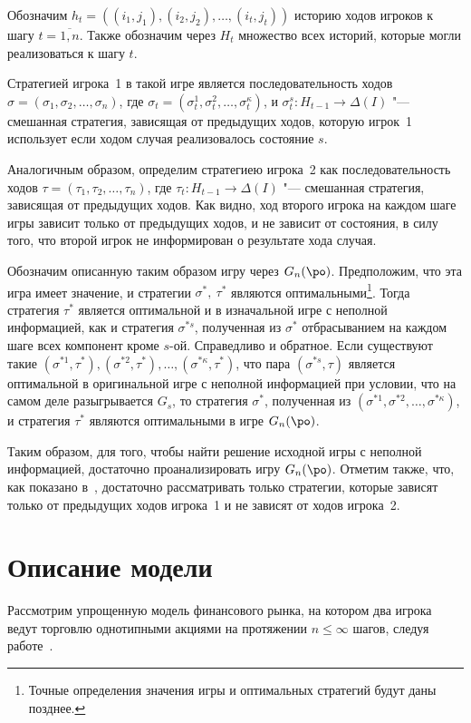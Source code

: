 {Обозначим $h_t = \left((i_1, j_1), (i_2, j_2), \ldots, (i_t, j_t)\right)$ историю ходов игроков к шагу $t = \overline{1, n}$. Также обозначим через $H_t$ множество всех историй, которые могли реализоваться к шагу $t$. 

Стратегией игрока~1 в такой игре является последовательность ходов $\sigma = (\sigma_1, \sigma_2, \ldots, \sigma_n)$, где $\sigma_t = (\sigma^1_t, \sigma^2_t, \ldots, \sigma^\kappa_t)$, и $\sigma^s_t: H_{t-1} \rightarrow \Delta(I)$ "--- смешанная стратегия, зависящая от предыдущих ходов, которую игрок~1 использует если ходом случая реализовалось состояние $s$.

Аналогичным образом, определим стратегиею игрока~2 как последовательность ходов $\tau = (\tau_1, \tau_2, \ldots, \tau_n)$, где $\tau_t: H_{t-1} \rightarrow \Delta(I)$ "--- смешанная стратегия, зависящая от предыдущих ходов.
Как видно, ход второго игрока на каждом шаге игры зависит только от предыдущих ходов, и не зависит от состояния, в силу того, что второй игрок не информирован о результате хода случая.

Обозначим описанную таким образом игру через $G_n(\po)$. Предположим, что эта игра имеет значение, и стратегии $\sigma^*,\ \tau^*$ являются оптимальными\footnote{Точные определения значения игры и оптимальных стратегий будут даны позднее.}.
Тогда стратегия $\tau^*$ является оптимальной и в изначальной игре с неполной информацией, как и стратегия $\sigma^{*s}$, полученная из $\sigma^*$ отбрасыванием на каждом шаге всех компонент кроме $s$-ой.
Справедливо и обратное.
Если существуют такие $(\sigma^{*1}, \tau^*), (\sigma^{*2}, \tau^*), \ldots, (\sigma^{*\kappa}, \tau^*)$, что пара $(\sigma^{*s}, \tau)$ является оптимальной в оригинальной игре с неполной информацией при условии, что на самом деле разыгрывается $G_s$, то стратегия $\sigma^*$, полученная из $(\sigma^{*1}, \sigma^{*2}, \ldots, \sigma^{*\kappa})$, и стратегия $\tau^*$ являются оптимальными в игре $G_n(\po)$.

Таким образом, для того, чтобы найти решение исходной игры с неполной информацией, достаточно проанализировать игру $G_n(\po)$.
Отметим также, что, как показано в~\cite{aumann95}, достаточно рассматривать только стратегии, которые зависят только от предыдущих ходов игрока~1 и не зависят от ходов игрока~2.

\section{Описание модели}\label{ch1:model}
Рассмотрим упрощенную модель финансового рынка, на котором два игрока ведут торговлю однотипными акциями на протяжении $n \leqslant \infty$ шагов, следуя работе~\cite{domansky07}.

}
